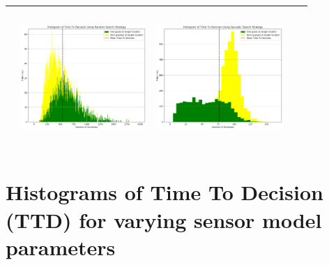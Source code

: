 \begin{landscape}
\begin{table}[h!]
\begin{tabular}{ | c | c | c | c | c |}
\begin{minipage}[c][58mm][c]{48mm}
    \end{minipage}
    &
    \begin{minipage}[c][58mm][c]{48mm}
      \includegraphics[width=48mm, height=52mm]{Chapters/MultiAgentTargetDetection/Figs/Histograms/VaryingInitBelief/25/25RandomHistogram.png}
    \end{minipage}
    &
    \begin{minipage}[c][58mm][c]{48mm}
      \includegraphics[width=48mm, height=52mm]{Chapters/MultiAgentTargetDetection/Figs/Histograms/VaryingInitBelief/25/25SaccadicHistogram.png}
    \end{minipage}
    \\
    \hline
   
  \end{tabular}
  \label{table:HistVaryingCumulativeInitial}
\end{table}
\break




\section{Histograms of Time To Decision (TTD) for varying sensor model parameters}


\end{landscape}
